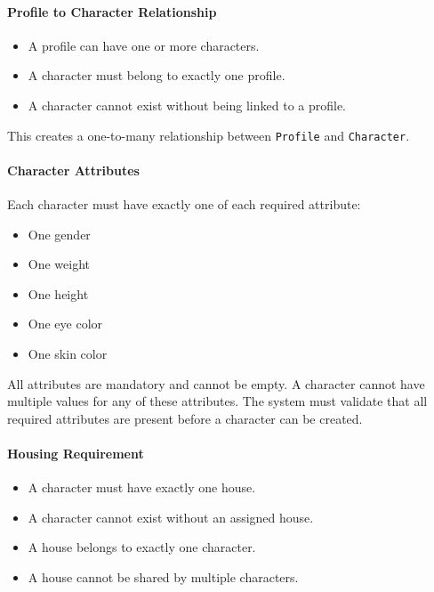 \hypertarget{profile-to-character-relationship}{%
\paragraph{Profile to Character
Relationship}\label{profile-to-character-relationship}}

\begin{itemize}
\tightlist
\item
  A profile can have one or more characters.
\item
  A character must belong to exactly one profile.
\item
  A character cannot exist without being linked to a profile.
\end{itemize}

This creates a one-to-many relationship between \texttt{Profile} and
\texttt{Character}.

\hypertarget{character-attributes}{%
\paragraph{Character Attributes}\label{character-attributes}}

Each character must have exactly one of each required attribute:

\begin{itemize}
\tightlist
\item
  One gender
\item
  One weight
\item
  One height
\item
  One eye color
\item
  One skin color
\end{itemize}

All attributes are mandatory and cannot be empty. A character cannot
have multiple values for any of these attributes. The system must
validate that all required attributes are present before a character can
be created.

\newpage

\hypertarget{housing-requirement}{%
\paragraph{Housing Requirement}\label{housing-requirement}}

\begin{itemize}
\tightlist
\item
  A character must have exactly one house.
\item
  A character cannot exist without an assigned house.
\item
  A house belongs to exactly one character.
\item
  A house cannot be shared by multiple characters.
\end{itemize}

